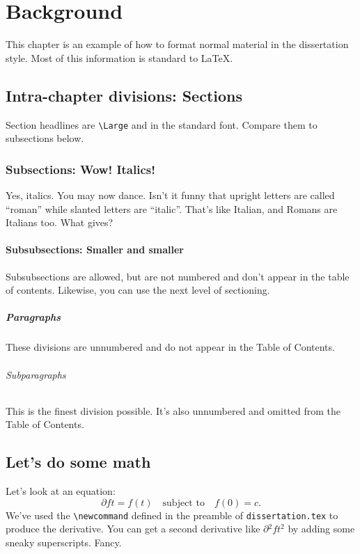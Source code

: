 \chapter{Background}
\label{sec:background}

This chapter is an example of how to format normal material in the
dissertation style.  Most of this information is standard to \LaTeX.

\section{Intra-chapter divisions: Sections}

Section headlines are {\verb"\Large"} and in the standard font. Compare them
to subsections below.

\subsection{Subsections: Wow! Italics!}

Yes, italics.  You may now dance.  Isn't it funny that upright letters are
called ``roman'' while slanted letters are ``italic''.  That's like Italian,
and Romans are Italians too.  What gives?  

\subsubsection{Subsubsections: Smaller and smaller}

Subsubsections are allowed, but are not numbered and don't appear in the
table of contents.  Likewise, you can use the next level of sectioning.

\paragraph{Paragraphs} These divisions are
unnumbered and do not appear in the Table of Contents.
\subparagraph{Subparagraphs} This is the finest division possible.  It's also
unnumbered and omitted from the Table of Contents.


\section{Let's do some math}
Let's look at an equation:
\begin{equation}
\label{eq:diffeq}
\partial{f}{t} = f(t) \quad \text{subject to} \quad f(0) = c.
\end{equation}
We've used the {\verb"\newcommand"} defined in the preamble of 
{\verb"dissertation.tex"} to produce the derivative.  You can get a second
derivative like $\partial{^2 f}{t^2}$ by adding some sneaky superscripts.  Fancy.  

